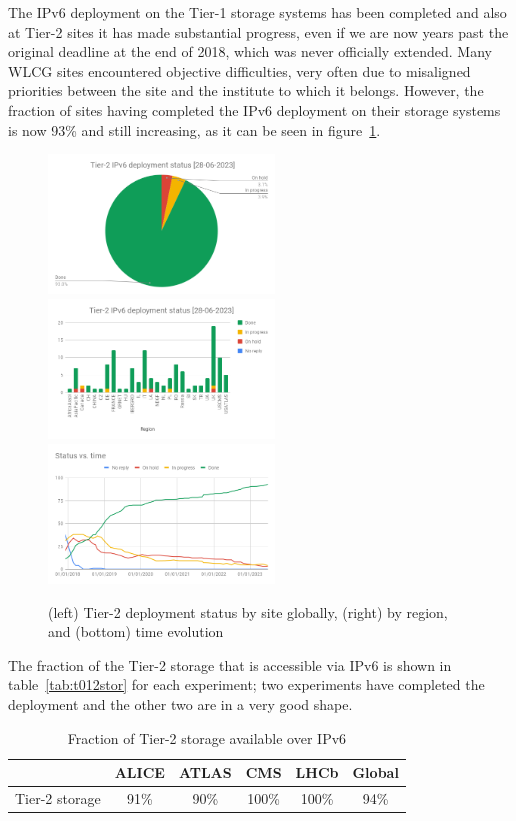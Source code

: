 The IPv6 deployment on the Tier-1 storage systems has been completed
and also at Tier-2 sites it has made substantial progress, even if we
are now years past the original deadline at the end of 2018, which was
never officially extended. Many WLCG sites encountered objective
difficulties, very often due to misaligned priorities between the site
and the institute to which it belongs. However, the fraction of sites
having completed the IPv6 deployment on their storage systems is now
93\% and still increasing, as it can be seen in
figure~\ref{fig:t2depl}.

\begin{figure}[h]
\centering
\includegraphics[width=6cm]{chart2}
\includegraphics[width=6cm]{chart}
\includegraphics[width=6cm]{chart3}
\caption{(left) Tier-2 deployment status by site globally, (right) by region,
and (bottom) time evolution}
\label{fig:t2depl}
\end{figure}

The fraction of the Tier-2 storage that is accessible via IPv6 is
shown in table~\ref{tab:t012stor} for each experiment; two experiments have
completed the deployment and the other two are in a very good shape.
\begin{table}[h]
\centering
\caption{Fraction of Tier-2 storage available over IPv6}
\label{tab:t12stor}
\begin{tabular}{lccccc}
\hline
& ALICE & ATLAS & CMS & LHCb & Global \\\hline
Tier-2 storage & 91\% & 90\% &  100\% & 100\% & 94\% \\\hline
\end{tabular}
\end{table}


